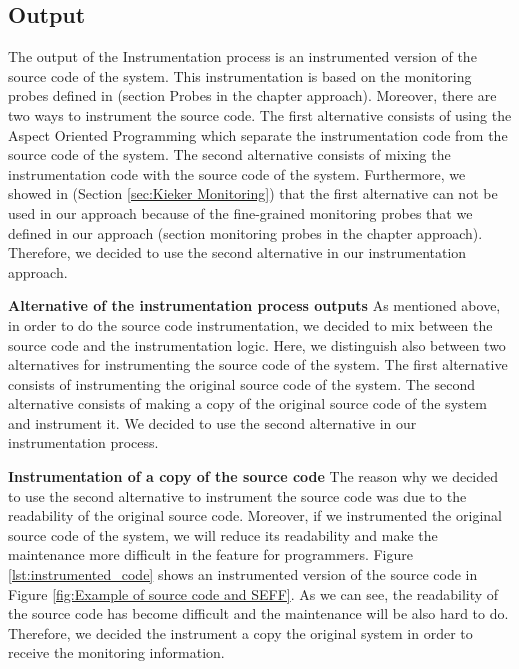 \subsection{Output}
\label{sec:output}

The output of the Instrumentation process is an instrumented version of the source code of the system.  This instrumentation is based on the monitoring probes defined in (section Probes in the chapter approach). Moreover, there are two ways to instrument the source code. The first alternative consists of using the Aspect Oriented Programming which separate the instrumentation code from the source code of the system. The second alternative consists of mixing the instrumentation code with the source code of the system. Furthermore, we showed in (Section \ref{sec:Kieker Monitoring}) that the first alternative can not be used in our approach because of the fine-grained monitoring probes that we defined in our approach (section monitoring probes in the chapter approach). Therefore, we decided to use the second alternative in our instrumentation approach.

\textbf{Alternative of the instrumentation process outputs}
As mentioned above, in order to do the source code instrumentation, we decided to mix between the source code and the instrumentation logic.  Here, we distinguish also between two alternatives for instrumenting the source code of the system. The first alternative consists of instrumenting the original source code of the system. The second alternative consists of making a copy of the original source code of the system and instrument it. We decided to use the second alternative in our instrumentation process. 

\textbf{Instrumentation of a copy of the source code}
The reason why we decided to use the second alternative to instrument the source code was due to the readability of the original source code. Moreover, if we instrumented the original source code of the system, we will reduce its readability and make the maintenance more difficult in the feature for programmers. Figure \ref{lst:instrumented_code} shows an instrumented version of the source code in Figure \ref{fig:Example of source code and SEFF}. As we can see, the readability of the source code has become difficult and the maintenance will be also hard to do. Therefore, we decided the instrument a copy the original system in order to receive the monitoring information.


